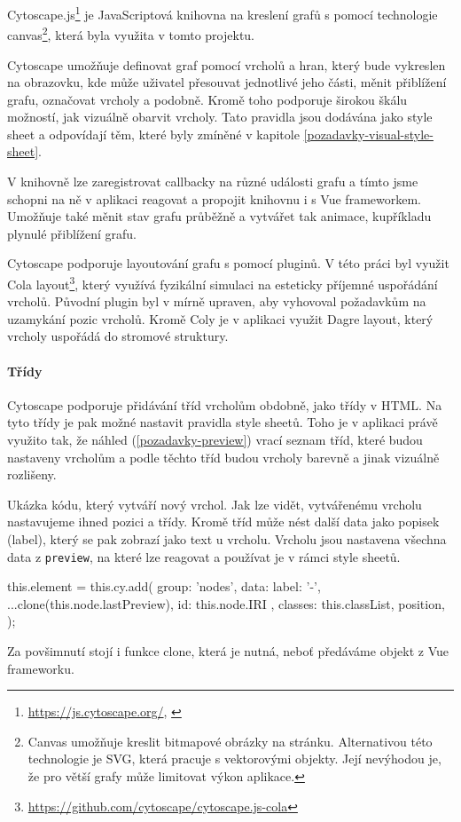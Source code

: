 Cytoscape.js\footnote{\url{https://js.cytoscape.org/}, \citet{10.1093/bioinformatics/btv557}} je JavaScriptová knihovna na kreslení grafů s pomocí technologie canvas\footnote{Canvas umožňuje kreslit bitmapové obrázky na stránku. Alternativou této technologie je SVG, která pracuje s vektorovými objekty. Její nevýhodou je, že pro větší grafy může limitovat výkon aplikace.}, která byla využita v tomto projektu.

Cytoscape umožňuje definovat graf pomocí vrcholů a hran, který bude vykreslen na obrazovku, kde může uživatel přesouvat jednotlivé jeho části, měnit přiblížení grafu, označovat vrcholy a podobně. Kromě toho podporuje širokou škálu možností, jak vizuálně obarvit vrcholy. Tato pravidla jsou dodávána jako style sheet a odpovídají těm, které byly zmíněné v kapitole \ref{pozadavky-visual-style-sheet}.

V knihovně lze zaregistrovat callbacky na různé události grafu a tímto jsme schopni na ně v aplikaci reagovat a propojit knihovnu i s Vue frameworkem. Umožňuje také měnit stav grafu průběžně a vytvářet tak animace, kupříkladu plynulé přiblížení grafu.

Cytoscape podporuje layoutování grafu s pomocí pluginů. V této práci byl využit Cola layout\footnote{\url{https://github.com/cytoscape/cytoscape.js-cola}}, který využívá fyzikální simulaci na esteticky příjemné uspořádání vrcholů. Původní plugin byl v mírně upraven, aby vyhovoval požadavkům na uzamykání pozic vrcholů. Kromě Coly je v aplikaci využit Dagre layout, který vrcholy uspořádá do stromové struktury.

\paragraph{Třídy} Cytoscape podporuje přidávání tříd vrcholům obdobně, jako třídy v HTML. Na tyto třídy je pak možné nastavit pravidla style sheetů. Toho je v aplikaci právě využito tak, že náhled (\ref{pozadavky-preview}) vrací seznam tříd, které budou nastaveny vrcholům a podle těchto tříd budou vrcholy barevně a jinak vizuálně rozlišeny.


\begin{prikl}
Ukázka kódu, který vytváří nový vrchol. Jak lze vidět, vytvářenému vrcholu nastavujeme ihned pozici a třídy. Kromě tříd může nést další data jako popisek (label), který se pak zobrazí jako text u vrcholu. Vrcholu jsou nastavena všechna data z \texttt{preview}, na které lze reagovat a používat je v rámci style sheetů.
\begin{code}
this.element = this.cy.add({
    group: 'nodes',
    data: {
      label: '-',
      ...clone(this.node.lastPreview),
      id: this.node.IRI
    },
    classes: this.classList,
    position,
});
\end{code}
Za povšimnutí stojí i funkce clone, která je nutná, neboť předáváme objekt z Vue frameworku.
\end{prikl}


